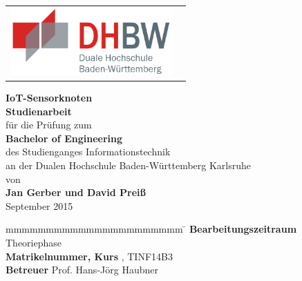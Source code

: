 \begin{titlepage}
	\begin{longtable}{p{} p{}}
		{\includegraphics[height=2.6cm]{bilder/dhbw}}
	\end{longtable}
	\enlargethispage{20mm}
	\begin{center}
		\vspace*{12mm}	{\LARGE\bf IoT-Sensorknoten }\\
		\vspace*{12mm}	{\large\bf Studienarbeit}\\
		\vspace*{12mm}	für die Prüfung zum\\
		\vspace*{3mm}		{\bf Bachelor of Engineering}\\
    \vspace*{12mm}	des Studienganges Informationstechnik{} \\
    \vspace*{3mm}		an der Dualen Hochschule Baden-Württemberg Karlsruhe{} \\
		\vspace*{12mm}	von\\
		\vspace*{3mm}		{\large\bf Jan Gerber und David Preiß}\\
		\vspace*{12mm}	September 2015\\
	\end{center}
	\vfill
	\begin{spacing}{1.2}
	\begin{tabbing}
		mmmmmmmmmmmmmmmmmmmmmm            \= \kill
		\textbf{Bearbeitungszeitraum}       \>  Theoriephase\\
		\textbf{Matrikelnummer, Kurs}  , TINF14B3\\
		\textbf{Betreuer}               \>  Prof. Hans-Jörg Haubner
	\end{tabbing}
	\end{spacing}
\end{titlepage}
